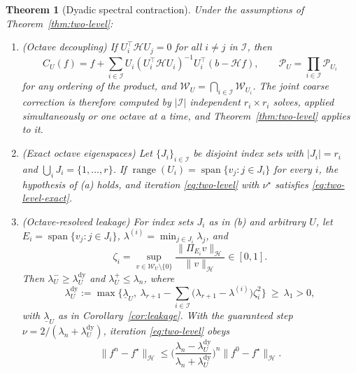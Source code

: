\documentclass{article}
\newtheorem{theorem}{Theorem}
\begin{document}
\begin{theorem}[Dyadic spectral contraction]
\label{thm:dyadic-level}
Under the assumptions of Theorem~\ref{thm:two-level}:
\begin{enumerate}[label=\textup{(\alph*)}]
\item \emph{(Octave decoupling)} If $U_i^\top\mathcal HU_j=0$ for all $i\neq j$ in $\mathcal I$, then
\begin{equation}
\label{eq:dyadic-coarse}
C_U(f)=f+\sum_{i\in\mathcal I}U_i(U_i^\top\mathcal HU_i)^{-1}U_i^\top(b-\mathcal Hf),
\qquad
\mathcal P_U=\prod_{i\in\mathcal I}\mathcal P_{U_i}
\end{equation}
for any ordering of the product, and $\mathcal W_U=\bigcap_{i\in\mathcal I}\mathcal W_{U_i}$. The joint coarse correction is therefore computed by $|\mathcal I|$ independent $r_i\times r_i$ solves, applied simultaneously or one octave at a time, and Theorem~\ref{thm:two-level} applies to it.
\item \emph{(Exact octave eigenspaces)} Let $\{J_i\}_{i\in\mathcal I}$ be disjoint index sets with $|J_i|=r_i$ and $\bigcup_iJ_i=\{1,\dots,r\}$. If $\operatorname{range}(U_i)=\operatorname{span}\{v_j:j\in J_i\}$ for every $i$, the hypothesis of (a) holds, and iteration \eqref{eq:two-level} with $\nu^\star$ satisfies \eqref{eq:two-level-exact}.
\item \emph{(Octave-resolved leakage)} For index sets $J_i$ as in (b) and arbitrary $U$, let $E_i=\operatorname{span}\{v_j:j\in J_i\}$, $\lambda^{(i)}=\min_{j\in J_i}\lambda_j$, and
\begin{equation}
\label{eq:octave-leakage}
\zeta_i=\sup_{v\in\mathcal W_U\setminus\{0\}}\frac{\|\Pi_{E_i}v\|_{\mathcal H}}{\|v\|_{\mathcal H}}\in[0,1].
\end{equation}
Then $\lambda_U^-\ge\lambda_U^{\mathrm{dy}}$ and $\lambda_U^+\le\lambda_n$, where
\begin{equation}
\label{eq:lambda-dy}
\lambda_U^{\mathrm{dy}}:=\max\Big\{\underline\lambda_U,\ \lambda_{r+1}-\sum_{i\in\mathcal I}\big(\lambda_{r+1}-\lambda^{(i)}\big)\zeta_i^2\Big\}\ \ge\ \lambda_1>0,
\end{equation}
with $\underline\lambda_U$ as in Corollary~\ref{cor:leakage}. With the guaranteed step $\nu=2/(\lambda_n+\lambda_U^{\mathrm{dy}})$, iteration \eqref{eq:two-level} obeys
\begin{equation}
\label{eq:dyadic-rate}
\|f^n-f^\star\|_{\mathcal H}\le\Big(\frac{\lambda_n-\lambda_U^{\mathrm{dy}}}{\lambda_n+\lambda_U^{\mathrm{dy}}}\Big)^n\|f^0-f^\star\|_{\mathcal H}.
\end{equation}
\end{enumerate}
\end{theorem}
\end{document}
